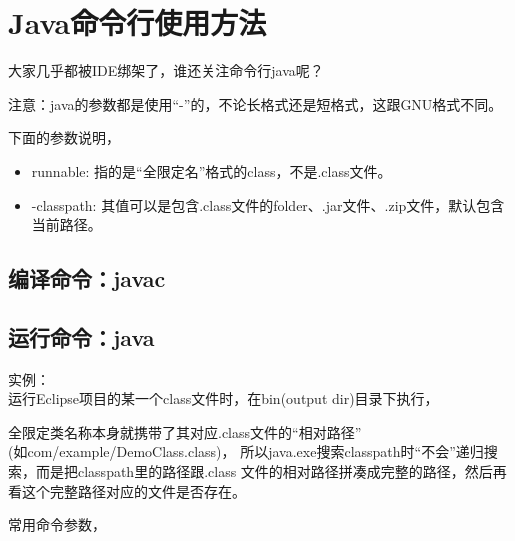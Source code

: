\section[Java命令行使用方法]{Java命令行使用方法}
大家几乎都被IDE绑架了，谁还关注命令行java呢？\par
注意：java的参数都是使用“-”的，不论长格式还是短格式，这跟GNU格式不同。

下面的参数说明，
\begin{itemize}
  \item runnable: 指的是“全限定名”格式的class，不是.class文件。
  \item -classpath: 其值可以是包含.class文件的folder、.jar文件、.zip文件，默认包含当前路径。
\end{itemize}


\subsection[编译命令：javac]{编译命令：javac}

\subsection[运行命令：java]{运行命令：java}

实例：\\
运行Eclipse项目的某一个class文件时，在bin(output dir)目录下执行，

全限定类名称本身就携带了其对应.class文件的“相对路径”\\(如com/example/DemoClass.class)，
所以java.exe搜索classpath时“不会”递归搜索，而是把classpath里的路径跟.class
文件的相对路径拼凑成完整的路径，然后再看这个完整路径对应的文件是否存在。

常用命令参数，

